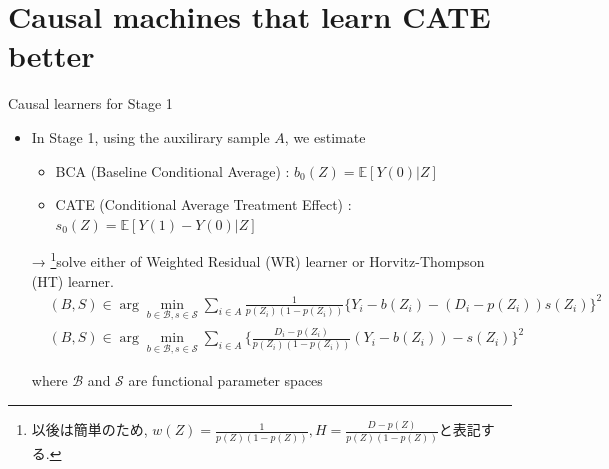 \documentclass[xcolor=svgnames,aspectratio=169]{beamer}
\newcommand{\E}{\mathbb{E}}
\begin{document}
\section{Causal machines that learn CATE better}

\begin{frame}{Causal learners for Stage 1}
    \begin{itemize}
        \item In Stage 1, using the auxilirary sample $A$, we estimate 
        \begin{itemize}
            \item BCA (Baseline Conditional Average) : $b_0(Z)=\E[Y(0)|Z]$
            \item CATE (Conditional Average Treatment Effect) : $s_0(Z)=\E[Y(1)-Y(0)|Z]$
        \end{itemize}
        → \footnote{以後は簡単のため, $w(Z)=\frac{1}{p(Z)(1-p(Z))},H=\frac{D-p(Z)}{p(Z)(1-p(Z))}$と表記する.}solve \alert{either} of Weighted Residual (WR) learner or Horvitz-Thompson (HT) learner.
        \begin{align*}
            &(B,S)\in \arg\min_{b\in\mathcal{B} , s\in\mathcal{S} }\sum_{i\in A} \frac{1}{p(Z_i)(1-p(Z_i))}\{Y_i-b(Z_i)-(D_i-p(Z_i))s(Z_i)\}^2 \\
            &(B,S)\in \arg\min_{b\in\mathcal{B} , s\in\mathcal{S} }\sum_{i\in A} \{\frac{D_i-p(Z_i)}{p(Z_i)(1-p(Z_i))}(Y_i-b(Z_i))-s(Z_i)\}^2 
        \end{align*}
        \begin{center}
            where $\mathcal{B}$ and $\mathcal{S}$ are functional parameter spaces
        \end{center}
    \end{itemize}
\end{frame}
\end{document}
